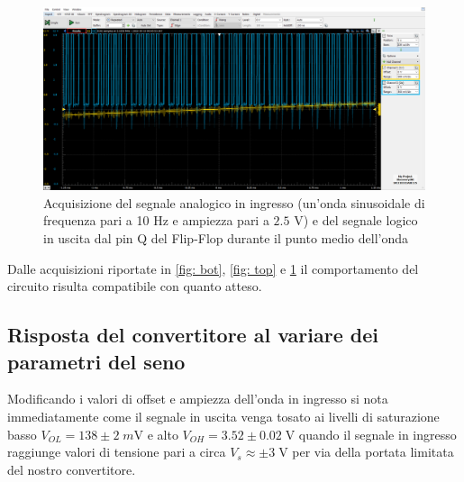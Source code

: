 \documentclass[10pt, a4paper, italian]{article}
\begin{document}
\begin{figure}[htbp]
    \centering
	\includegraphics[width=\textwidth]{MIDDLE}
    \caption{Acquisizione del segnale analogico in ingresso (un'onda sinusoidale di frequenza pari a 10 Hz e ampiezza pari a $2.5$ V) e del segnale logico in uscita dal pin Q del Flip-Flop durante il punto medio dell'onda
    \label{fig: middle}}
\end{figure}
Dalle acquisizioni riportate in \cref{fig: bot}, \cref{fig: top} e \cref{fig: middle}
il comportamento del circuito risulta compatibile con quanto atteso.

\subsection{Risposta del convertitore al variare dei parametri del seno}
\label{sbs: adcresp}
Modificando i valori di offset e ampiezza dell'onda in ingresso si nota
immediatamente come il segnale in uscita venga tosato ai livelli di
saturazione basso $V_{OL} = 138 \pm 2 \; \si{m\V}$ e alto
$V_{OH} = 3.52 \pm 0.02 \; \si{\V}$ quando il segnale in ingresso raggiunge
valori di tensione pari a circa $V_s \approx \pm 3 \; \si{\V}$ per via della
portata limitata del nostro convertitore.
\end{document}
